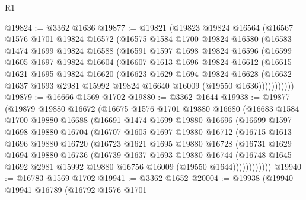 \begin{lexlean}{R1}
\begin{coremodule}
@19824 := @3362 @1636
@19877 := @19821
    (@19823
      @19824
      @16564
      (@16567
        @1576
        @1701
        @19824
        @16572
        (@16575
          @1584
          @1700
          @19824
          @16580
          (@16583
            @1474
            @1699
            @19824
            @16588
            (@16591
              @1597
              @1698
              @19824
              @16596
              (@16599
                @1605
                @1697
                @19824
                @16604
                (@16607
                  @1613
                  @1696
                  @19824
                  @16612
                  (@16615
                    @1621
                    @1695
                    @19824
                    @16620
                    (@16623
                      @1629
                      @1694
                      @19824
                      @16628
                      (@16632 @1637 @1693 @2981 @15992 @19824 @16640 @16009 (@19550 @1636)))))))))))
@19879 := @16666 @1569 @1702
@19880 := @3362 @1644
@19938 := @19877
    (@19879
      @19880
      @16672
      (@16675
        @1576
        @1701
        @19880
        @16680
        (@16683
          @1584
          @1700
          @19880
          @16688
          (@16691
            @1474
            @1699
            @19880
            @16696
            (@16699
              @1597
              @1698
              @19880
              @16704
              (@16707
                @1605
                @1697
                @19880
                @16712
                (@16715
                  @1613
                  @1696
                  @19880
                  @16720
                  (@16723
                    @1621
                    @1695
                    @19880
                    @16728
                    (@16731
                      @1629
                      @1694
                      @19880
                      @16736
                      (@16739
                        @1637
                        @1693
                        @19880
                        @16744
                        (@16748
                          @1645
                          @1692
                          @2981
                          @15992
                          @19880
                          @16756
                          @16009
                          (@19550 @1644))))))))))))
@19940 := @16783 @1569 @1702
@19941 := @3362 @1652
@20004 := @19938
    (@19940
      @19941
      @16789
      (@16792
        @1576
        @1701

\end{coremodule}
\end{lexlean}
